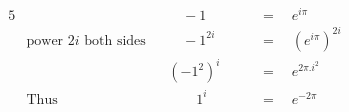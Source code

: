 \begin{alignat*}{5}
&\,&&\quad-1\quad&&\,=\quad e^{i\pi}\\
&\text{power }2i\text{ both sides}&&\quad-1^{2i}\quad&&\,=\quad\left(e^{i\pi}\right)^{2i}\\
&\,&&\left(-1^2\right)^i\quad&&\,=\quad e^{2\pi.i^2}\\
&\text{Thus}&&\qquad1^i\quad&&\,=\quad e^{-2\pi}
\end{alignat*}
